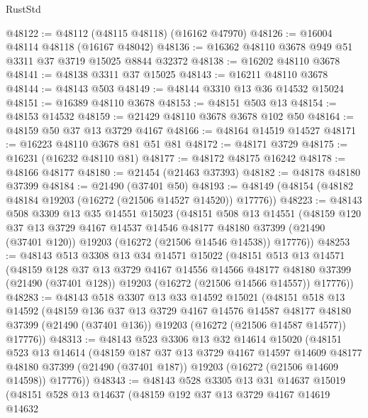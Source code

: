 \begin{lexlean}{RustStd}
\begin{coremodule}
@48122 := @48112 (@48115 @48118) (@16162 @47970)
@48126 := @16004 @48114 @48118 (@16167 @48042)
@48136 := @16362 @48110 @3678 @949 @51 @3311 @37 @3719 @15025 @8844 @32372
@48138 := @16202 @48110 @3678
@48141 := @48138 @3311 @37 @15025
@48143 := @16211 @48110 @3678
@48144 := @48143 @503
@48149 := @48144 @3310 @13 @36 @14532 @15024
@48151 := @16389 @48110 @3678
@48153 := @48151 @503 @13
@48154 := @48153 @14532
@48159 := @21429 @48110 @3678 @3678 @102 @50
@48164 := @48159 @50 @37 @13 @3729 @4167
@48166 := @48164 @14519 @14527
@48171 := @16223 @48110 @3678 @81 @51 @81
@48172 := @48171 @3729
@48175 := @16231 (@16232 @48110 @81)
@48177 := @48172 @48175 @16242
@48178 := @48166 @48177
@48180 := @21454 (@21463 @37393)
@48182 := @48178 @48180 @37399
@48184 := @21490 (@37401 @50)
@48193 := @48149 (@48154 (@48182 @48184 @19203 (@16272 (@21506 @14527 @14520)) @17776))
@48223 := @48143
    @508
    @3309
    @13
    @35
    @14551
    @15023
    (@48151
      @508
      @13
      @14551
      (@48159
        @120
        @37
        @13
        @3729
        @4167
        @14537
        @14546
        @48177
        @48180
        @37399
        (@21490 (@37401 @120))
        @19203
        (@16272 (@21506 @14546 @14538))
        @17776))
@48253 := @48143
    @513
    @3308
    @13
    @34
    @14571
    @15022
    (@48151
      @513
      @13
      @14571
      (@48159
        @128
        @37
        @13
        @3729
        @4167
        @14556
        @14566
        @48177
        @48180
        @37399
        (@21490 (@37401 @128))
        @19203
        (@16272 (@21506 @14566 @14557))
        @17776))
@48283 := @48143
    @518
    @3307
    @13
    @33
    @14592
    @15021
    (@48151
      @518
      @13
      @14592
      (@48159
        @136
        @37
        @13
        @3729
        @4167
        @14576
        @14587
        @48177
        @48180
        @37399
        (@21490 (@37401 @136))
        @19203
        (@16272 (@21506 @14587 @14577))
        @17776))
@48313 := @48143
    @523
    @3306
    @13
    @32
    @14614
    @15020
    (@48151
      @523
      @13
      @14614
      (@48159
        @187
        @37
        @13
        @3729
        @4167
        @14597
        @14609
        @48177
        @48180
        @37399
        (@21490 (@37401 @187))
        @19203
        (@16272 (@21506 @14609 @14598))
        @17776))
@48343 := @48143
    @528
    @3305
    @13
    @31
    @14637
    @15019
    (@48151
      @528
      @13
      @14637
      (@48159
        @192
        @37
        @13
        @3729
        @4167
        @14619
        @14632

\end{coremodule}
\end{lexlean}
